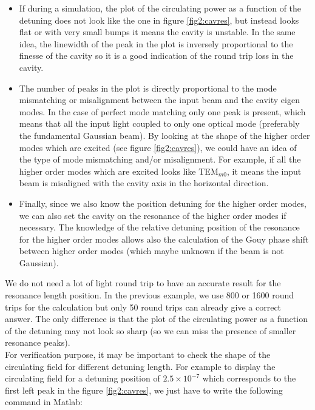 \begin{itemize}
  \item If during a simulation, the plot of the circulating power as a function of the detuning does not look like the one in figure \ref{fig2:cavres}, but instead looks flat or with very small bumps it means the cavity is unstable. In the same idea, the linewidth of the peak in the plot is inversely proportional to the finesse of the cavity so it is a good indication of the round trip loss in the cavity.
  \item The number of peaks in the plot is directly proportional to the mode mismatching or misalignment between the input beam and the cavity eigen modes. In the case of perfect mode matching only one peak is present, which means that all the input light coupled to only one optical mode (preferably the fundamental Gaussian beam). By looking at the shape of the higher order modes which are excited (see figure \ref{fig2:cavres}), we could have an idea of the type of mode mismatching and/or misalignment. For example, if all the higher order modes which are excited looks like TEM$_{m0}$, it means the input beam is misaligned with the cavity axis in the horizontal direction.
  \item Finally, since we also know the position detuning for the higher order modes, we can also set the cavity on the resonance of the higher order modes if necessary. The knowledge of the relative detuning position of the resonance for the higher order modes allows also the calculation of the Gouy phase shift between higher order modes (which maybe unknown if the beam is not Gaussian).\\
\end{itemize}

We do not need a lot of light round trip to have an accurate result for the resonance length position. In the previous example, we use 800 or 1600 round trips for the calculation but only 50 round trips can already give a correct answer. The only difference is that the plot of the circulating power as a function of the detuning may not look so sharp (so we can miss the presence of smaller resonance peaks).\\

For verification purpose, it may be important to check the shape of the circulating field for different detuning length. For example to display the circulating field for a detuning position of $2.5 \times 10^{-7}$ which corresponds to the first left peak in the figure \ref{fig2:cavres}, we just have to write the following command in Matlab:

